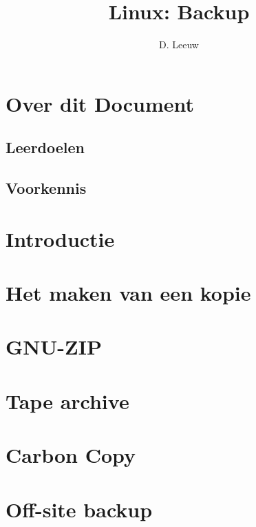 \documentclass[a4paper,12pt,twoside,openright,titlepage]{article}
\author{D. Leeuw}
\title{Linux: Backup}
\date{\today\\
\vfill
\raggedright
\copyright\ 2026 Dennis Leeuw\\
}
\begin{document}

\maketitle


\section{Over dit Document}
\subsection{Leerdoelen}

\subsection{Voorkennis}





\section{Introductie}


\section{Het maken van een kopie}


\section{GNU-ZIP}


\section{Tape archive}


\section{Carbon Copy}


\section{Off-site backup}


\printindex
\end{document}
